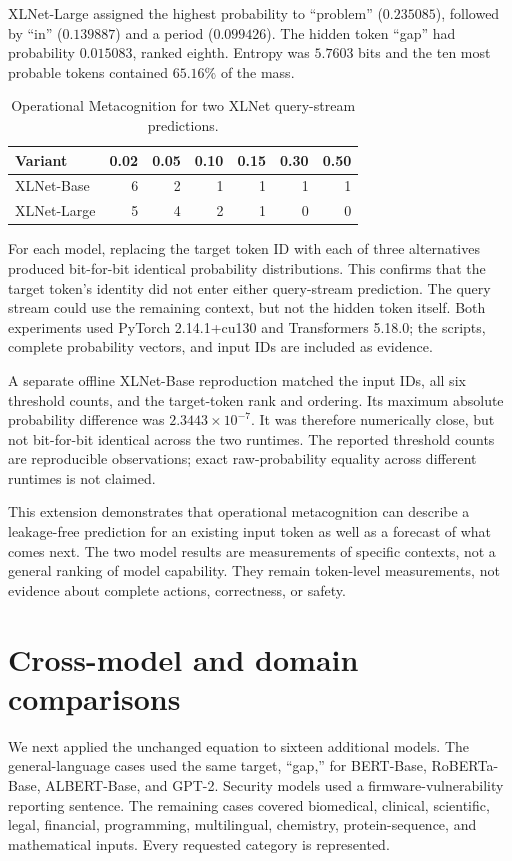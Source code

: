 \documentclass[11pt,a4paper]{article}
\begin{document}
XLNet-Large assigned the highest probability to ``problem'' ($0.235085$), followed by ``in'' ($0.139887$) and a period ($0.099426$). The hidden token ``gap'' had probability $0.015083$, ranked eighth. Entropy was $5.7603$ bits and the ten most probable tokens contained $65.16\%$ of the mass.

\begin{table}[h]
\centering
\caption{Operational Metacognition for two XLNet query-stream predictions.}
\label{tab:xlnet}
\begin{tabular}{lrrrrrr}
\toprule
Variant & 0.02 & 0.05 & 0.10 & 0.15 & 0.30 & 0.50 \\
\midrule
XLNet-Base & 6 & 2 & 1 & 1 & 1 & 1 \\
XLNet-Large & 5 & 4 & 2 & 1 & 0 & 0 \\
\bottomrule
\end{tabular}
\end{table}

For each model, replacing the target token ID with each of three alternatives produced bit-for-bit identical probability distributions. This confirms that the target token's identity did not enter either query-stream prediction. The query stream could use the remaining context, but not the hidden token itself. Both experiments used PyTorch 2.14.1+cu130 and Transformers 5.18.0; the scripts, complete probability vectors, and input IDs are included as evidence.

A separate offline XLNet-Base reproduction matched the input IDs, all six threshold counts, and the target-token rank and ordering. Its maximum absolute probability difference was $2.3443\times10^{-7}$. It was therefore numerically close, but not bit-for-bit identical across the two runtimes. The reported threshold counts are reproducible observations; exact raw-probability equality across different runtimes is not claimed.

This extension demonstrates that operational metacognition can describe a leakage-free prediction for an existing input token as well as a forecast of what comes next. The two model results are measurements of specific contexts, not a general ranking of model capability. They remain token-level measurements, not evidence about complete actions, correctness, or safety.

\section{Cross-model and domain comparisons}
We next applied the unchanged equation to sixteen additional models. The general-language cases used the same target, ``gap,'' for BERT-Base, RoBERTa-Base, ALBERT-Base, and GPT-2. Security models used a firmware-vulnerability reporting sentence. The remaining cases covered biomedical, clinical, scientific, legal, financial, programming, multilingual, chemistry, protein-sequence, and mathematical inputs. Every requested category is represented.
\end{document}
